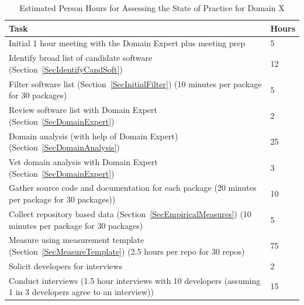\documentclass[letterpaper,cleveref]{lipics-v2019}
\newcounter{totHours} %
\begin{document}
\begin{table}[h]
  \caption{Estimated Person Hours for Assessing the State of Practice for Domain
  X} \label{TabPersonHours}
  \centering
  \begin{tabular}{p{10cm} l}
    \toprule
    \textbf{Task} & \textbf{Hours} \\
    \midrule

    Initial 1 hour meeting with the Domain Expert plus meeting prep & 5
    \addtocounter{totHours}{5} \\

    Identify broad list of candidate software
    (Section~\ref{SecIdentifyCandSoft}) & 12 \addtocounter{totHours}{12} \\

    Filter software list (Section~\ref{SecInitialFilter}) (10 minutes per
    package for 30 packages) & 5 \addtocounter{totHours}{5} \\

	Review software list with Domain Expert (Section~\ref{SecDomainExpert}) & 2
	\addtocounter{totHours}{2} \\

    Domain analysis (with help of Domain Expert)
    (Section~\ref{SecDomainAnalysis}) & 25 \addtocounter{totHours}{20} \\

	Vet domain analysis with Domain Expert (Section~\ref{SecDomainExpert}) & 3
	\addtocounter{totHours}{3} \\

	Gather source code and documentation for each package (20 minutes per
	package for 30 packages)) & 10 \addtocounter{totHours}{10} \\

    Collect repository based data (Section~\ref{SecEmpiricalMeasures}) (10
    minutes per package for 30 packages) & 5 \addtocounter{totHours}{5} \\

	Measure using measurement template (Section~\ref{SecMeasureTemplate}) (2.5
    hours per repo for 30 repos) & 75 \addtocounter{totHours}{75} \\

    Solicit developers for interviews & 2 \addtocounter{totHours}{2} \\

    Conduct interviews (1.5 hour interviews with 10 developers (assuming 1 in 3
    developers agree to an interview)) & 15 \addtocounter{totHours}{15} \\


\end{tabular}
\end{table}
\end{document}
